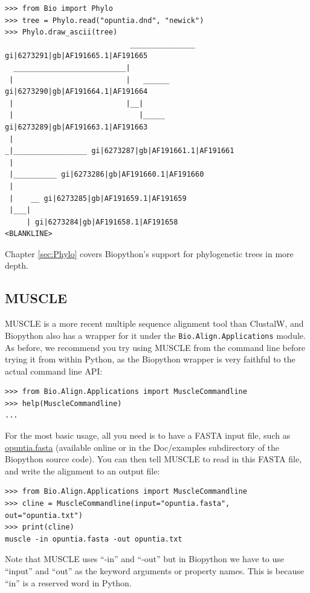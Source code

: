 \documentclass{report}
\begin{document}
\begin{verbatim}
>>> from Bio import Phylo
>>> tree = Phylo.read("opuntia.dnd", "newick")
>>> Phylo.draw_ascii(tree)
                             _______________ gi|6273291|gb|AF191665.1|AF191665
  __________________________|
 |                          |   ______ gi|6273290|gb|AF191664.1|AF191664
 |                          |__|
 |                             |_____ gi|6273289|gb|AF191663.1|AF191663
 |
_|_________________ gi|6273287|gb|AF191661.1|AF191661
 |
 |__________ gi|6273286|gb|AF191660.1|AF191660
 |
 |    __ gi|6273285|gb|AF191659.1|AF191659
 |___|
     | gi|6273284|gb|AF191658.1|AF191658
<BLANKLINE>
\end{verbatim}

\noindent Chapter \ref{sec:Phylo} covers Biopython's support for phylogenetic trees in more
depth.

\subsection{MUSCLE}
MUSCLE is a more recent multiple sequence alignment tool than ClustalW, and
Biopython also has a wrapper for it under the \verb|Bio.Align.Applications|
module. As before, we recommend you try using MUSCLE from the command line before
trying it from within Python, as the Biopython wrapper is very faithful to the
actual command line API:

\begin{verbatim}
>>> from Bio.Align.Applications import MuscleCommandline
>>> help(MuscleCommandline)
...
\end{verbatim}

For the most basic usage, all you need is to have a FASTA input file, such as
\href{http://biopython.org/DIST/docs/tutorial/examples/opuntia.fasta}{opuntia.fasta}
(available online or in the Doc/examples subdirectory of the Biopython source
code). You can then tell MUSCLE to read in this FASTA file, and write the
alignment to an output file:

\begin{verbatim}
>>> from Bio.Align.Applications import MuscleCommandline
>>> cline = MuscleCommandline(input="opuntia.fasta", out="opuntia.txt")
>>> print(cline)
muscle -in opuntia.fasta -out opuntia.txt
\end{verbatim}

Note that MUSCLE uses ``-in'' and ``-out'' but in Biopython we have to use
``input'' and ``out'' as the keyword arguments or property names. This is
because ``in'' is a reserved word in Python.
\end{document}
